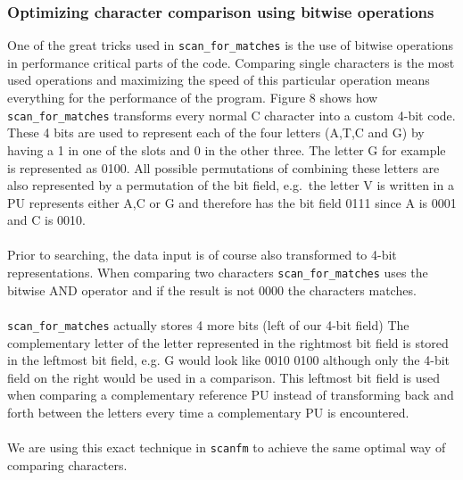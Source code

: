 \documentclass[12pt]{article}
\newcommand{\scm}{\texttt{scan\_for\_matches} }
\newcommand{\sfm}{\texttt{scanfm} }
\newcommand{\pu}{PU }
\begin{document}
\subsubsection{Optimizing character comparison using bitwise operations}
One of the great tricks used in \scm is the use of bitwise operations in performance critical parts of the code.
Comparing single characters is the most used operations and maximizing the speed of this particular operation 
means everything for the performance of the program. Figure 8 shows how \scm transforms every normal C character into
a custom 4-bit code. These 4 bits are used to represent each of the four letters (A,T,C and G) by having a 1 in one of
the slots and 0 in the other three. The letter G for example is represented as 0100. All possible permutations of 
combining these letters are also represented by a permutation of the bit field, e.g.\ the letter V is written in a \pu 
represents either A,C or G and therefore has the bit field 0111 since A is 0001 and C is 0010. \\ \\
Prior to searching, the data input is of course also transformed to 4-bit representations.
When comparing two characters \scm uses the bitwise AND operator and if the result is not 0000 the characters matches. \\ \\
\scm actually stores 4 more bits (left of our 4-bit field) The complementary letter of the letter represented in the rightmost
bit field is stored in the leftmost bit field, e.g. G would look like 0010 0100 although only the 4-bit field on the right 
would be used in a comparison. This leftmost bit field is used when comparing a complementary reference \pu instead
of transforming back and forth between the letters every time a complementary \pu is encountered. \\ \\
We are using this exact technique in \sfm to achieve the same optimal way of comparing characters.
\end{document}

